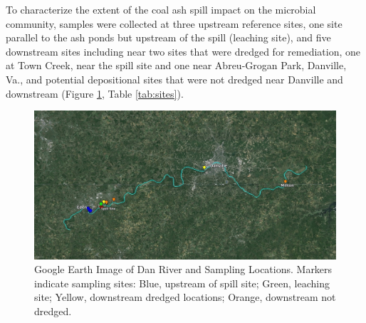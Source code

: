 \documentclass[ms, hidelinks]{uncgdissertationexp}
\theoremstyle{plain}
\theoremstyle{definition}
\theoremstyle{remark}
\begin{document}
To characterize the extent of the coal ash spill impact on the microbial community, samples were collected at three upstream reference sites, one site parallel to the ash ponds but upstream of the spill (leaching site), and five downstream sites including near two sites that were dredged for remediation, one at Town Creek, near the spill site and one near Abreu-Grogan Park, Danville, Va., and potential depositional sites that were not dredged near Danville and downstream (Figure \ref{fig:map}, Table \ref{tab:sites}).
\begin{figure}[H]
\centering
    \includegraphics[width=375pt]{figure/map}
  \singlespace \caption[Google Earth Image of Dan River and Sampling Locations.]{Google Earth Image of Dan River and Sampling Locations. Markers indicate sampling sites: Blue, upstream of spill site; Green, leaching site; Yellow, downstream dredged locations; Orange, downstream not dredged.}\label{fig:map}
\end{figure}
\end{document}
